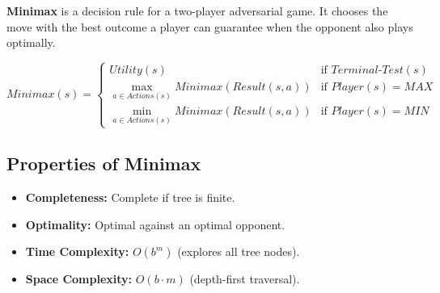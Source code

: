 \documentclass[12pt,a4paper]{article}
\begin{document}
\begin{tcolorbox}[defbox, title={Minimax}]
\textbf{Minimax} is a decision rule for a two-player adversarial game. It chooses the move with the best outcome a player can guarantee when the opponent also plays optimally.
\end{tcolorbox}

\begin{tcolorbox}[formulabox, title={Minimax Value Definition}]
  \begin{equation}
    Minimax(s) = \begin{cases}
      Utility(s) & \text{if } Terminal\text{-}Test(s) \\
      \max_{a \in Actions(s)} Minimax(Result(s, a)) & \text{if } Player(s) = MAX \\
      \min_{a \in Actions(s)} Minimax(Result(s, a)) & \text{if } Player(s) = MIN
    \end{cases}
  \end{equation}
\end{tcolorbox}

\begin{tcolorbox}[tikzbox, title={Minimax Game Tree Visualization}]
\centering
{}
\end{tcolorbox}

\subsection{Properties of Minimax}
\begin{itemize}[leftmargin=*, itemsep=3pt]
  \item \textbf{Completeness:} Complete if tree is finite.
  \item \textbf{Optimality:} Optimal against an optimal opponent.
  \item \textbf{Time Complexity:} $O(b^m)$ (explores all tree nodes).
  \item \textbf{Space Complexity:} $O(b \cdot m)$ (depth-first traversal).
\end{itemize}

\end{document}
